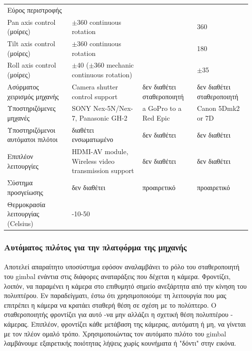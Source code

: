 \documentclass[a4paper, 12pt, twoside]{report}
\begin{document}
{{{{{{\begin{landscape}
\begin{longtable} { m{3cm} m{3.5cm} m{3.5cm} m{3.5cm}}
					\hdashline
					Εύρος περιστροφής & & & \\
					Pan axis control (μοίρες) & $\pm$360 continuous rotation & & 360\\
					Tilt axis control (μοίρες) & $\pm$360 continuous rotation & & 180\\
					Roll axis control (μοίρες) & $\pm$40 ($\pm$360 mechanic continuous rotation) & & $\pm$35\\
					\hdashline
					Ασύρματος χειρισμός μηχανής & Camera shutter control support & δεν διαθέτει σταθεροποιητή & δεν διαθέτει σταθεροποιητή\\
					\hdashline
					Υποστηριζόμενες μηχανές & SONY Nex-5N/Nex-7, Panasonic GH-2 & a GoPro to a Red Epic & Canon 5Dmk2 or 7D\\
					\hdashline
					Υποστηριζόμενοι αυτόματοι πιλότοι & διαθέτει ενσωματωμένο & δεν διαθέτει & δεν διαθέτει\\
					\hdashline
					Επιπλέον λειτουργίες & HDMI-AV module, Wireless video transmission support & δεν διαθέτει & δεν διαθέτει\\
					\hdashline
					Σύστημα προσγείωσης & δεν διαθέτει & προαιρετικό & προαιρετικό\\
					\hdashline
					Θερμοκρασία λειτουργίας (Celsius) & -10-50 & & \\
					\hline
				\end{longtable}
				\end{landscape}
			
		\subsubsection{Αυτόματος πιλότος για την πλατφόρμα της μηχανής}
			\paragraph{}{Αποτελεί απαραίτητο υποσύστημα εφόσον αναλαμβάνει το ρόλο του σταθεροποιητή του gimbal ενάντια στις διάφορες αναταράξεις που δέχεται η κάμερα. Φροντίζει, λοιπόν, να παραμένει η κάμερα στο επιθυμητό σημείο ανεξάρτητα από την κίνηση του πολυπτέρου. Εν παραδείγματι, έστω ότι χρησιμοποιούμε τη λειτουργία που μας επιτρέπει η κάμερα να κρατάει σταθερή θέση σε σχέση με το πολύπτερο. Ο σταθεροποιητής φροντίζει για αυτό -να μην αλλάζει η σχετική θέση πολυπτέρου - κάμερας. Επιπλέον, φροντίζει κάθε μετάβαση της κάμερας, αυτόματη ή μη, να γίνεται με τον πλέον ομαλό τρόπο. Χρησιμοποιώντας τον αυτόματο πιλότο του gimbal λαμβάνουμε εξαιρετικής ποιότητας λήψεις χωρίς κουνήματα ή "δόντι" στην εικόνα.
			}
}}}}}}
\end{document}

